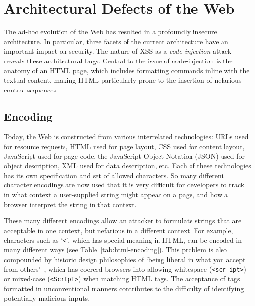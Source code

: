\documentclass{acmtrans2m}
\begin{document}
\section{Architectural Defects of the Web}\label{sec:web-architecture-defects}

The ad-hoc evolution of the Web has resulted in a profoundly insecure architecture.
In particular, three facets of the current architecture have an important impact on security.
The nature of XSS as a \emph{code-injection} attack reveals these architectural bugs.
Central to the issue of code-injection is the anatomy of an HTML page, which includes formatting commands inline with the textual content, making HTML particularly prone to the insertion of nefarious control sequences.

\subsection{Encoding}\label{sec:encoding}
Today, the Web is constructed from various interrelated technologies: URLs used for resource requests, HTML used for page layout, CSS used for content layout, JavaScript used for page code, the JavaScript Object Notation (JSON) used for object description, XML used for data description, etc.
Each of these technologies has its own specification and set of allowed characters.
So many different character encodings are now used that it is very difficult for developers to track in what context a user-supplied string might appear on a page, and how a browser interpret the string in that context.

These many different encodings allow an attacker to formulate strings that are acceptable in one context, but nefarious in a different context.
For example, characters such as `\texttt{<}', which has special meaning in HTML, can be encoded in many different ways (see Table~\ref{tab:html-encoding}).
This problem is also compounded by historic design philosophies of `being liberal in what you accept from others'~\cite{rfc761}, which has coerced browsers into allowing whitespace (\texttt{<scr ipt>}) or mixed-case (\texttt{<ScrIpT>}) when matching HTML tags.
The acceptance of tags formatted in unconventional manners contributes to the difficulty of identifying potentially malicious inputs.
\end{document}
